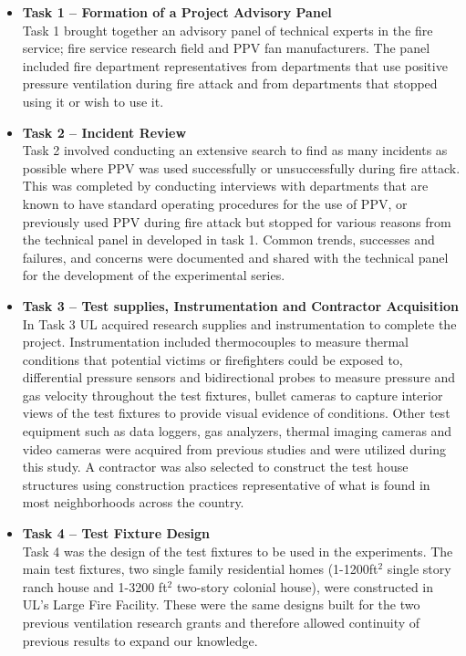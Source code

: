 \documentclass{article}
\begin{document}
\begin{itemize}
	\item \textbf{Task 1 – Formation of a Project Advisory Panel} \\ 
	Task 1 brought together an advisory panel of technical experts in the fire service; fire service research field and PPV fan manufacturers. The panel included fire department representatives from departments that use positive pressure ventilation during fire attack and from departments that stopped using it or wish to use it. 
	
	\item \textbf{Task 2 – Incident Review} \\
	Task 2 involved conducting an extensive search to find as many incidents as possible where PPV was used successfully or unsuccessfully during fire attack. This was completed by conducting interviews with departments that are known to have standard operating procedures for the use of PPV, or previously used PPV during fire attack but stopped for various reasons from the technical panel in developed in task 1. Common trends, successes and failures, and concerns were documented and shared with the technical panel for the development of the experimental series. 
	
	\item \textbf{Task 3 – Test supplies, Instrumentation and Contractor Acquisition} \\
	In Task 3 UL acquired research supplies and instrumentation to complete the project. Instrumentation included thermocouples to measure thermal conditions that potential victims or firefighters could be exposed to, differential pressure sensors and bidirectional probes to measure pressure and gas velocity throughout the test fixtures, bullet cameras to capture interior views of the test fixtures to provide visual evidence of conditions. Other test equipment such as data loggers, gas analyzers, thermal imaging cameras and video cameras were acquired from previous studies and were utilized during this study. A contractor was also selected to construct the test house structures using construction practices representative of what is found in most neighborhoods across the country.
	
	\item \textbf{Task 4 – Test Fixture Design} \\
	Task 4 was the design of the test fixtures to be used in the experiments. The main test fixtures, two single family residential homes (1-1200ft$^2$ single story ranch house and 1-3200 ft$^2$ two-story colonial house), were constructed in UL’s Large Fire Facility. These were the same designs built for the two previous ventilation research grants and therefore allowed continuity of previous results to expand our knowledge.
	

\end{itemize}
\end{document}
